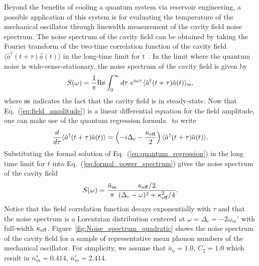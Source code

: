 \documentclass[pra,aps,showpacs,twocolumn,floatfix, superscriptaddress, nofootinbib, nobibnotes]{revtex4-1}
\begin{document}
Beyond the benefits of cooling a quantum system via reservoir engineering, a possible application of this system is for evaluating the temperature of the mechanical oscillator through linewidth measurement of the cavity field noise spectrum. The noise spectrum of the cavity field can be obtained by taking the Fourier transform of the two-time correlation function of the cavity field $ \langle \hat a^\dag(t+\tau)\hat a(t)\rangle$ in the long-time limit for $t$~\cite{Quantum_noise_book}. In the limit where the quantum noise is wide-sense-stationary, the noise spectrum of the cavity field is given by~\cite{Scully_book}
\begin{equation}
 S(\omega) = \frac{1}{\pi}{\rm Re}\int_{0}^{\infty}d\tau~ e^{i\omega \tau}\langle \hat a^\dag(t+\tau)\hat a(t)\rangle_{\rm ss} ,
 \label{eq:formal_power_spectrum}
\end{equation}
where $\rm ss$ indicates the fact that the cavity field is in steady-state.
Now that Eq.~(\ref{eq:field_amplitude}) is a linear differential equation for the field amplitude, one can make use of the quantum regression formula~\cite{Carmichael_book_1} to write
\begin{equation}
\frac{d}{d\tau} \langle \hat a^\dag(t+\tau) \hat a(t) \rangle =\left(-i\Delta_c-\frac{\kappa_{\rm eff}}{2}\right)\langle \hat a^\dag(t+\tau) \hat a(t) \rangle.
\label{eq:quantum_regression}
\end{equation}
Substituting the formal solution of Eq.~(\ref{eq:quantum_regression}) in the long time limit for $t$ into Eq.~(\ref{eq:formal_power_spectrum}) gives the noise spectrum of the cavity field
\begin{equation}
 S(\omega) =  \frac{\bar n_{\rm ss}}{\pi}\frac{\kappa_{\rm eff}/2}{(\Delta_c-\omega)^2+\kappa_{\rm eff}^2/4}.
 \label{eq:noise_spectrum}
\end{equation}
Notice that the field correlation function decays exponentially with $\tau$ and that the noise spectrum is a Lorentzian distribution centered at $\omega = \Delta_c=-2\omega_m'$ with full-width $\kappa_{\rm eff}$.
Figure~\ref{fig:Noise_spectrum_quadratic} shows the noise spectrum of the cavity field for a sample of representative mean phonon numbers of the mechanical oscillator. For simplicity, we assume that $\bar n_o=1.0$, $C_2=1.0$ which result in $\bar n_m^s = 0.414$, $\bar n_m^c = 2.414$. 
\end{document}
